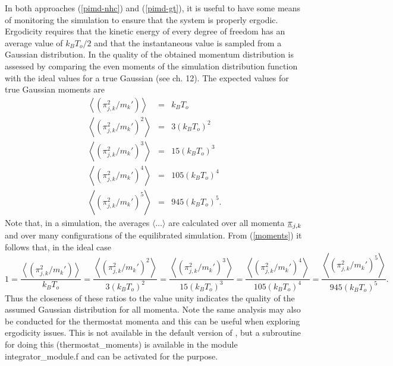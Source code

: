 In both approaches (\ref{pimd-nhc}) and (\ref{pimd-gt}), it is useful
to have some means of monitoring the simulation to ensure that the
system is properly ergodic. Ergodicity requires that the kinetic
energy of every degree of freedom has an average value of
$k_{B}T_{o}/2$ and that the instantaneous value is sampled from a
Gaussian distribution. In \DD{} the quality of the obtained momentum
distribution is assessed by comparing the even moments of the
simulation distribution function with the ideal values for a true
Gaussian (see \cite{smith-14} ch. 12).  The expected values for true
Gaussian moments are
\begin{eqnarray}
  \left \langle (\pi_{j,k}^{2}/m_{k}') \right \rangle &=& k_{B}T_{o} \nonumber \\
  \left \langle (\pi_{j,k}^{2}/m_{k}')^{2} \right \rangle &=& 3 (k_{B}T_{o})^{2} \nonumber \\
  \left \langle (\pi_{j,k}^{2}/m_{k}')^{3} \right \rangle &=& 15(k_{B}T_{o})^{3}  \label{moments}\\
  \left \langle (\pi_{j,k}^{2}/m_{k}')^{4} \right \rangle &=& 105(k_{B}T_{o})^{4} \nonumber \\
  \left \langle (\pi_{j,k}^{2}/m_{k}')^{5} \right \rangle &=& 945(k_{B}T_{o})^{5}. \nonumber
\end{eqnarray}
Note that, in a simulation, the averages $\langle \ldots \rangle$ are
calculated over all momenta $\mbox{$\underline{\pi}$}_{j,k}$ and over many
configurations of the equilibrated simulation.  From (\ref{moments})
it follows that, in the ideal case
\begin{equation}
  1=\frac{\left \langle (\pi_{j,k}^{2}/m_{k}') \right \rangle }{k_{B}T_{o}}=
  \frac{\left \langle (\pi_{j,k}^{2}/m_{k}')^{2} \right \rangle }{3 (k_{B}T_{o})^{2}}=
  \frac{\left \langle (\pi_{j,k}^{2}/m_{k}')^{3} \right \rangle }{15 (k_{B}T_{o})^{3}}=
  \frac{\left \langle (\pi_{j,k}^{2}/m_{k}')^{4} \right \rangle }{105 (k_{B}T_{o})^{4}}=
  \frac{\left \langle (\pi_{j,k}^{2}/m_{k}')^{5} \right \rangle }{945 (k_{B}T_{o})^{5}}.
  \label{nmom}
\end{equation}
Thus the closeness of these ratios to the value unity indicates the
quality of the assumed Gaussian distribution for all momenta.  Note
the same analysis may also be conducted for the thermostat momenta and
this can be useful when exploring ergodicity issues. This is not
available in the default version of \D{}, but a subroutine for doing
this ({\sc thermostat\_moments}) is available in the module {\sc
  integrator\_module.f} and can be activated for the purpose.

